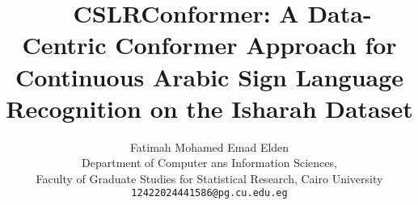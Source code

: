 \documentclass[10pt,twocolumn,letterpaper]{article}
\title{\ \ CSLRConformer: A Data-Centric Conformer Approach for Continuous Arabic Sign Language Recognition on the Isharah Dataset}
\author{Fatimah Mohamed Emad Elden\\
Department of Computer ans Information Sciences, \\
Faculty of Graduate Studies for Statistical Research, Cairo University\\
{\tt\small 12422024441586@pg.cu.edu.eg}
}
\begin{document}
\maketitle










{
    \small
    
    
}
\end{document}
